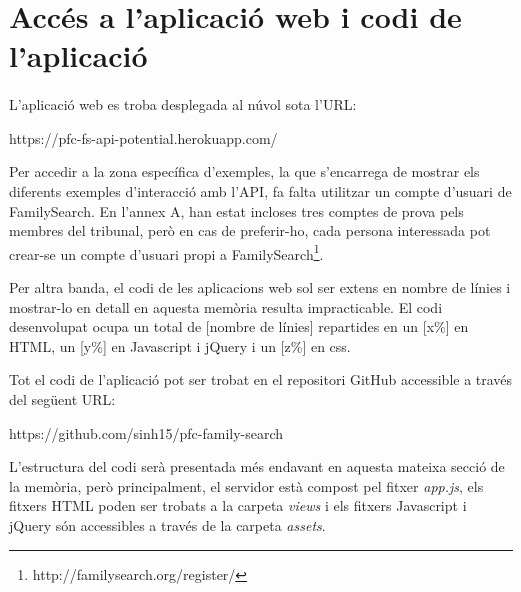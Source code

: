 \section{Accés a l'aplicació web i codi de l'aplicació}

    \paragraph{}
    L’aplicació web es troba desplegada al núvol sota l'URL:

    \begin{displayquote}
        https://pfc-fs-api-potential.herokuapp.com/
    \end{displayquote}

    Per accedir a la zona específica d’exemples, la que s’encarrega de mostrar els diferents exemples d’interacció amb l’API, fa falta utilitzar un compte d’usuari de FamilySearch. En l’annex A, han estat incloses tres comptes de prova pels membres del tribunal, però en cas de preferir-ho, cada persona interessada pot crear-se un compte d’usuari propi a FamilySearch\footnote{http://familysearch.org/register/}.

    Per altra banda, el codi de les aplicacions web sol ser extens en nombre de línies i mostrar-lo en detall en aquesta memòria resulta impracticable. El codi desenvolupat ocupa un total de [nombre de línies] repartides en un  [x\%] en HTML, un [y\%] en Javascript i jQuery i un [z\%] en css.

    Tot el codi de l’aplicació pot ser trobat en el repositori GitHub accessible a través del següent URL:

    \begin{displayquote}
        https://github.com/sinh15/pfc-family-search
    \end{displayquote}

    L’estructura del codi serà presentada més endavant en aquesta mateixa secció de la memòria, però principalment, el servidor està compost pel fitxer \emph{app.js}, els fitxers HTML poden ser trobats a la carpeta \emph{views} i els fitxers Javascript i jQuery són accessibles a través de la carpeta \emph{assets}.
